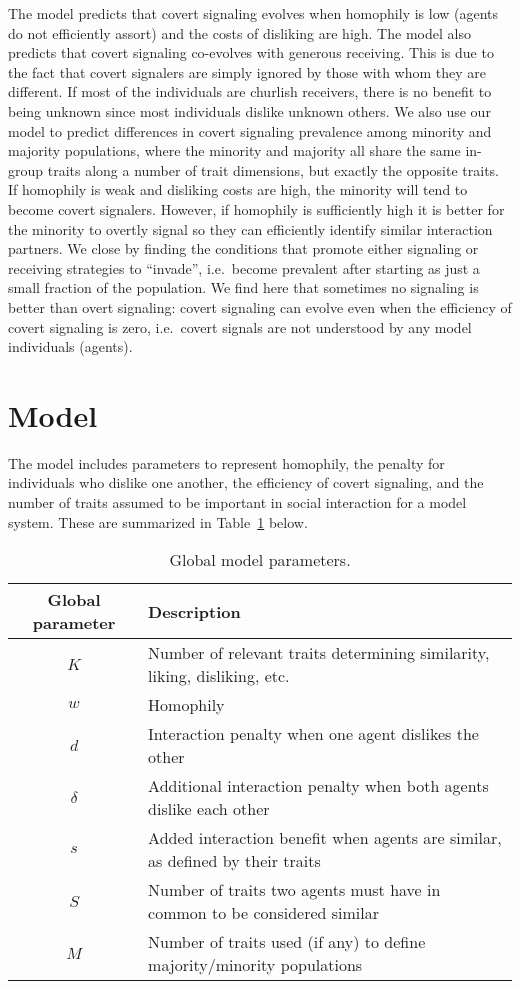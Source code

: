 \documentclass[11pt,letterpaper]{article}
\begin{document}
The model predicts that covert signaling evolves when homophily is low (agents
do not efficiently assort) and the costs of disliking are high. The model also 
predicts that covert signaling co-evolves with generous receiving. This is due
to the fact that covert signalers are simply ignored by those with whom
they are different. If most of the individuals are churlish receivers, there is
no benefit to being unknown since most individuals dislike unknown others. 
We also use our model to predict differences in covert signaling prevalence
among minority and majority populations, where the minority and majority all
share the same in-group traits along a number of trait dimensions, but exactly
the opposite traits. If homophily is weak and disliking costs are high, the
minority will tend to become covert signalers. However, if homophily is
sufficiently high it is better for the minority to overtly signal so they can
efficiently identify similar interaction partners. We close by finding the
conditions that promote either signaling or receiving strategies to ``invade'',
i.e.\ become prevalent after starting as just a small fraction of the population.
We find here that sometimes no signaling is better than overt signaling: 
covert signaling can evolve even when the efficiency of covert signaling is
zero, i.e.\ covert signals are not understood by any model individuals (agents).

\section{Model}

The model includes parameters to represent homophily, the penalty for 
individuals who dislike one another, the efficiency of covert signaling, and the
number of traits assumed to be important in social interaction for a model system.
These are summarized in Table~\ref{tab:params} below.

\vspace{1em}
\begin{table}[H]
  \centering
  \begin{tabular}{cl}
    Global parameter & Description \\
    \toprule 
    $K$      & Number of relevant traits determining similarity, liking, disliking, etc. \\
    $w$      & Homophily \\
    $d$      & Interaction penalty when one agent dislikes the other \\
    $\delta$ & Additional interaction penalty when both agents dislike each other \\
    $s$      & Added interaction benefit when agents are similar, as defined by their traits \\
    $S$      & Number of traits two agents must have in common to be considered similar \\
    $M$      & Number of traits used (if any) to define majority/minority populations \\
  \end{tabular}
  \caption{Global model parameters.}
  \label{tab:params}
\end{table}
\end{document}
